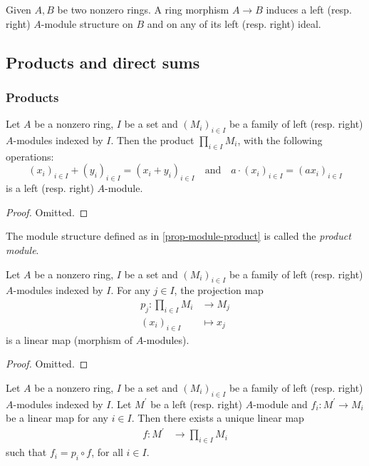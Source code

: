 \documentclass[12pt]{report}
\begin{document}
\begin{remark}
    Given $A, B$ be two nonzero rings. A ring morphism $A \to B$ induces a left (resp. right) $A$-module structure on $B$ and on any of its left (resp. right) ideal.
\end{remark}

\subsection{Products and direct sums}
\subsubsection{Products}

\begin{proposition} \label{prop-module-product}
    Let $A$ be a nonzero ring, $I$ be a set and $(M_i)_{i \in I}$ be a family of left (resp. right) $A$-modules indexed by $I$. Then the product $\prod\limits_{i \in I} M_i$, with the following operations:
    \[
        (x_i)_{i \in I} + (y_i)_{i \in I} = (x_i + y_i)_{i \in I} \quad \text{and} \quad a \cdot (x_i)_{i \in I} = (a x_i)_{i \in I}
    \]
    is a left (resp. right) $A$-module.
\end{proposition}

\begin{proof}
    Omitted.
\end{proof}

\begin{definition}
    The module structure defined as in \ref{prop-module-product} is called the \emph{product module}.
\end{definition}

\begin{proposition}
    Let $A$ be a nonzero ring, $I$ be a set and $(M_i)_{i \in I}$ be a family of left (resp. right) $A$-modules indexed by $I$. For any $j \in I$, the projection map 
    \[
        \begin{aligned}
            p_j \colon \prod_{i \in I} M_i &\longrightarrow M_j \\
            (x_i)_{i \in I} &\longmapsto x_j
        \end{aligned}
    \]
    is a linear map (morphism of $A$-modules).
\end{proposition}

\begin{proof}
    Omitted.
\end{proof}

\begin{theorem}
    Let $A$ be a nonzero ring, $I$ be a set and $(M_i)_{i \in I}$ be a family of left (resp. right) $A$-modules indexed by $I$. Let $M^{\prime}$ be a left (resp. right) $A$-module and $f_i \colon M^{\prime} \to M_i$ be a linear map for any $i \in I$. Then there exists a unique linear map
    \[
        \begin{aligned}
            f \colon M^{\prime} &\longrightarrow \prod_{i \in I} M_i
        \end{aligned}
    \]
    such that $f_i = p_i \circ f$, for all $i \in I$.
\end{theorem}
\end{document}
